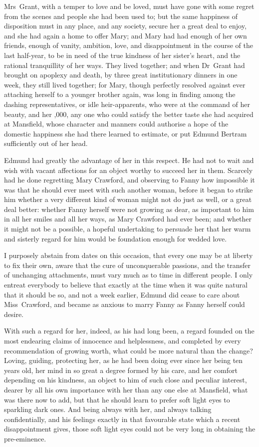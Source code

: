 Mrs~Grant, with a temper to love and be loved, must have gone with some regret from the scenes and people she had been used to; but the same happiness of disposition must in any place, and any society, secure her a great deal to enjoy, and she had again a home to offer Mary; and Mary had had enough of her own friends, enough of vanity, ambition, love, and disappointment in the course of the last half-year, to be in need of the true kindness of her sister's heart, and the rational tranquillity of her ways. They lived together; and when Dr~Grant had brought on apoplexy and death, by three great institutionary dinners in one week, they still lived together; for Mary, though perfectly resolved against ever attaching herself to a younger brother again, was long in finding among the dashing representatives, or idle heir-apparents, who were at the command of her beauty, and her ,000, any one who could satisfy the better taste she had acquired at Mansfield, whose character and manners could authorise a hope of the domestic happiness she had there learned to estimate, or put Edmund Bertram sufficiently out of her head.

Edmund had greatly the advantage of her in this respect. He had not to wait and wish with vacant affections for an object worthy to succeed her in them. Scarcely had he done regretting Mary Crawford, and observing to Fanny how impossible it was that he should ever meet with such another woman, before it began to strike him whether a very different kind of woman might not do just as well, or a great deal better: whether Fanny herself were not growing as dear, as important to him in all her smiles and all her ways, as Mary Crawford had ever been; and whether it might not be a possible, a hopeful undertaking to persuade her that her warm and sisterly regard for him would be foundation enough for wedded love.

I purposely abstain from dates on this occasion, that every one may be at liberty to fix their own, aware that the cure of unconquerable passions, and the transfer of unchanging attachments, must vary much as to time in different people. I only entreat everybody to believe that exactly at the time when it was quite natural that it should be so, and not a week earlier, Edmund did cease to care about Miss~Crawford, and became as anxious to marry Fanny as Fanny herself could desire.

With such a regard for her, indeed, as his had long been, a regard founded on the most endearing claims of innocence and helplessness, and completed by every recommendation of growing worth, what could be more natural than the change? Loving, guiding, protecting her, as he had been doing ever since her being ten years old, her mind in so great a degree formed by his care, and her comfort depending on his kindness, an object to him of such close and peculiar interest, dearer by all his own importance with her than any one else at Mansfield, what was there now to add, but that he should learn to prefer soft light eyes to sparkling dark ones. And being always with her, and always talking confidentially, and his feelings exactly in that favourable state which a recent disappointment gives, those soft light eyes could not be very long in obtaining the pre-eminence.

